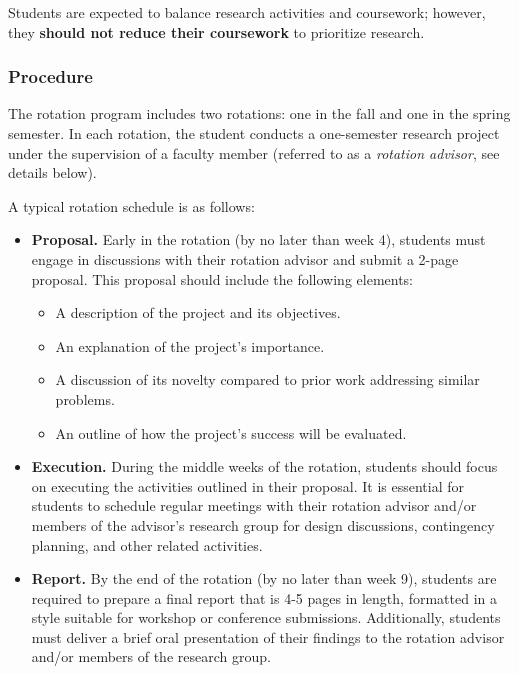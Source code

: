 Students are expected to balance research activities and coursework; however,
they \textbf{should not reduce their coursework} to prioritize research.


\subsubsection{Procedure}

The rotation program includes two rotations: one in the fall and one in the
spring semester. In each rotation, the student conducts a one-semester research
project under the supervision of a faculty member (referred to as a
\textit{rotation advisor}, see details below).

A typical rotation schedule is as follows:

\begin{itemize}[nosep]
\item \textbf{Proposal.}
  Early in the rotation (by no later than week 4), students must engage in discussions with their rotation advisor and submit a 2-page proposal. This proposal should include the following elements:
  \begin{itemize}[nosep]
    \item A description of the project and its objectives.
    \item An explanation of the project’s importance.
    \item A discussion of its novelty compared to prior work addressing similar problems.
    \item An outline of how the project's success will be evaluated.
  \end{itemize}
\item \textbf{Execution.}
  During the middle weeks of the rotation, students
  should focus on executing the activities outlined in their proposal. It is
  essential for students to schedule regular meetings with their rotation
  advisor and/or members of the advisor's research group for design discussions,
  contingency planning, and other related activities.
\item \textbf{Report.}
  By the end of the rotation (by no later than week 9),
  students are required to prepare a final report that is 4-5 pages in length,
  formatted in a style suitable for workshop or conference submissions.
  Additionally, students must deliver a brief oral presentation of their
  findings to the rotation advisor and/or members of the research group.
\end{itemize}

